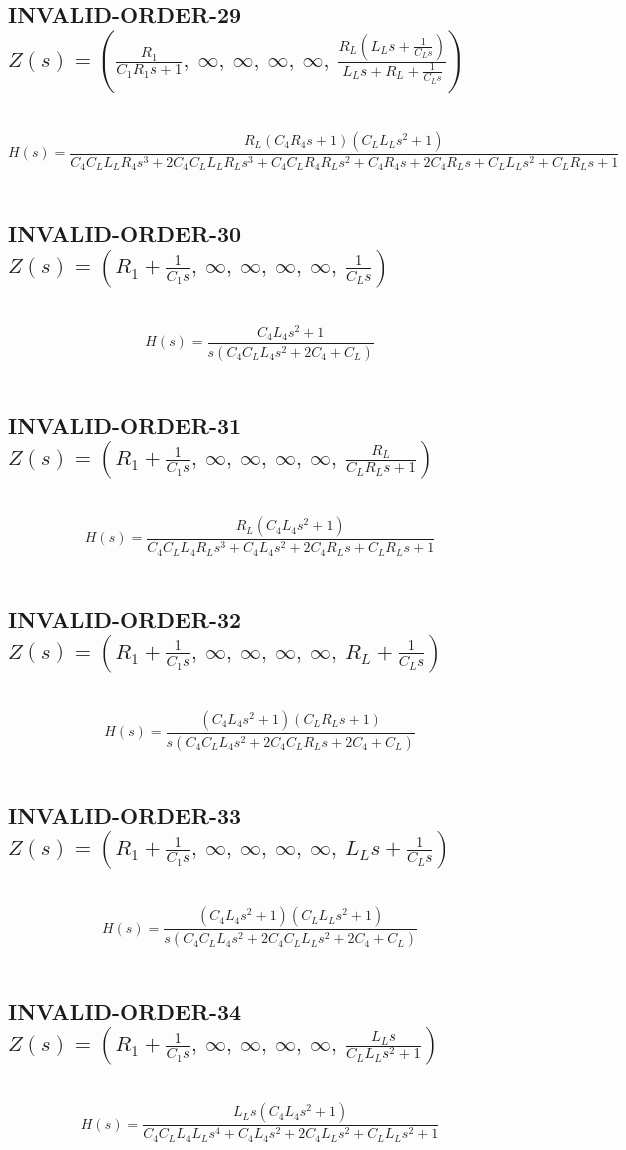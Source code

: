 \documentclass{article}
\begin{document}
\subsection{INVALID-ORDER-29 $Z(s) = \left( \frac{R_{1}}{C_{1} R_{1} s + 1}, \  \infty, \  \infty, \  \infty, \  \infty, \  \frac{R_{L} \left(L_{L} s + \frac{1}{C_{L} s}\right)}{L_{L} s + R_{L} + \frac{1}{C_{L} s}}\right)$ } \ 
\textbf{\[H(s) = \frac{R_{L} \left(C_{4} R_{4} s + 1\right) \left(C_{L} L_{L} s^{2} + 1\right)}{C_{4} C_{L} L_{L} R_{4} s^{3} + 2 C_{4} C_{L} L_{L} R_{L} s^{3} + C_{4} C_{L} R_{4} R_{L} s^{2} + C_{4} R_{4} s + 2 C_{4} R_{L} s + C_{L} L_{L} s^{2} + C_{L} R_{L} s + 1}\] } \ 
\subsection{INVALID-ORDER-30 $Z(s) = \left( R_{1} + \frac{1}{C_{1} s}, \  \infty, \  \infty, \  \infty, \  \infty, \  \frac{1}{C_{L} s}\right)$ } \ 
\textbf{\[H(s) = \frac{C_{4} L_{4} s^{2} + 1}{s \left(C_{4} C_{L} L_{4} s^{2} + 2 C_{4} + C_{L}\right)}\] } \ 
\subsection{INVALID-ORDER-31 $Z(s) = \left( R_{1} + \frac{1}{C_{1} s}, \  \infty, \  \infty, \  \infty, \  \infty, \  \frac{R_{L}}{C_{L} R_{L} s + 1}\right)$ } \ 
\textbf{\[H(s) = \frac{R_{L} \left(C_{4} L_{4} s^{2} + 1\right)}{C_{4} C_{L} L_{4} R_{L} s^{3} + C_{4} L_{4} s^{2} + 2 C_{4} R_{L} s + C_{L} R_{L} s + 1}\] } \ 
\subsection{INVALID-ORDER-32 $Z(s) = \left( R_{1} + \frac{1}{C_{1} s}, \  \infty, \  \infty, \  \infty, \  \infty, \  R_{L} + \frac{1}{C_{L} s}\right)$ } \ 
\textbf{\[H(s) = \frac{\left(C_{4} L_{4} s^{2} + 1\right) \left(C_{L} R_{L} s + 1\right)}{s \left(C_{4} C_{L} L_{4} s^{2} + 2 C_{4} C_{L} R_{L} s + 2 C_{4} + C_{L}\right)}\] } \ 
\subsection{INVALID-ORDER-33 $Z(s) = \left( R_{1} + \frac{1}{C_{1} s}, \  \infty, \  \infty, \  \infty, \  \infty, \  L_{L} s + \frac{1}{C_{L} s}\right)$ } \ 
\textbf{\[H(s) = \frac{\left(C_{4} L_{4} s^{2} + 1\right) \left(C_{L} L_{L} s^{2} + 1\right)}{s \left(C_{4} C_{L} L_{4} s^{2} + 2 C_{4} C_{L} L_{L} s^{2} + 2 C_{4} + C_{L}\right)}\] } \ 
\subsection{INVALID-ORDER-34 $Z(s) = \left( R_{1} + \frac{1}{C_{1} s}, \  \infty, \  \infty, \  \infty, \  \infty, \  \frac{L_{L} s}{C_{L} L_{L} s^{2} + 1}\right)$ } \ 
\textbf{\[H(s) = \frac{L_{L} s \left(C_{4} L_{4} s^{2} + 1\right)}{C_{4} C_{L} L_{4} L_{L} s^{4} + C_{4} L_{4} s^{2} + 2 C_{4} L_{L} s^{2} + C_{L} L_{L} s^{2} + 1}\] } \ 
\end{document}
